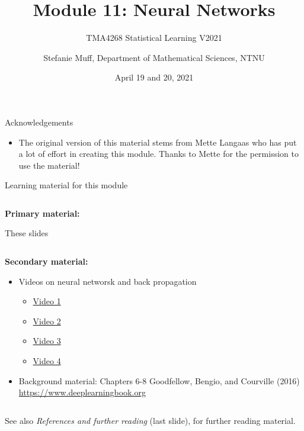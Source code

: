 \documentclass[10pt,ignorenonframetext,]{beamer}
\title{Module 11: Neural Networks}
\subtitle{TMA4268 Statistical Learning V2021}
\author{Stefanie Muff, Department of Mathematical Sciences, NTNU}
\date{April 19 and 20, 2021}
\providecommand{\tightlist}{%
  \setlength{\itemsep}{0pt}\setlength{\parskip}{0pt}}
\begin{document}
\frame{\titlepage}

\begin{frame}{Acknowledgements}
\protect\hypertarget{acknowledgements}{}

\begin{itemize}
\tightlist
\item
  The original version of this material stems from Mette Langaas who has
  put a lot of effort in creating this module. Thanks to Mette for the
  permission to use the material!
\end{itemize}

\end{frame}

\begin{frame}

\begin{block}{Learning material for this module}

\(~\)

\textbf{Primary material:}

These slides

\(~\)

\textbf{Secondary material:} \vspace{2mm}

\begin{itemize}
\tightlist
\item
  Videos on neural networsk and back propagation

  \begin{itemize}
  \tightlist
  \item
    \href{https://www.youtube.com/watch?v=aircAruvnKk}{Video 1}
  \item
    \href{https://www.youtube.com/watch?v=IHZwWFHWa-w}{Video 2}
  \item
    \href{https://www.youtube.com/watch?v=Ilg3gGewQ5U}{Video 3}
  \item
    \href{https://www.youtube.com/watch?v=tIeHLnjs5U8}{Video 4}
  \end{itemize}
\end{itemize}

\vspace{2mm}

\begin{itemize}
\tightlist
\item
  Background material: Chapters 6-8 Goodfellow, Bengio, and Courville
  (2016) \url{https://www.deeplearningbook.org}
\end{itemize}

\(~\)

See also \emph{References and further reading} (last slide), for further
reading material.

\end{block}

\end{frame}
\end{document}
